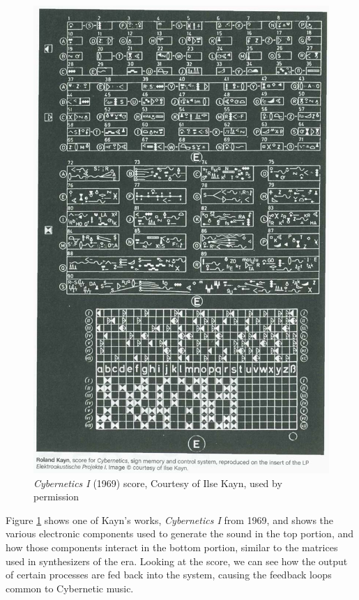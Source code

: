\begin{figure}
    \centering %
    \includegraphics[scale=0.45]{diagrams/kayn_cybernetics.jpeg}
    \caption{\textit{Cybernetics I} (1969) score, Courtesy of Ilse Kayn, used by permission}
    \label{cyberneticsScore}
\end{figure}


Figure \ref{cyberneticsScore} shows one of Kayn's works, \textit{Cybernetics I} from 1969, and shows the various electronic components used to generate the sound in the top portion, and how those components interact in the bottom portion, similar to the matrices used in synthesizers of the era. Looking at the score, we can see how the output of certain processes are fed back into the system, causing the feedback loops common to Cybernetic music.


